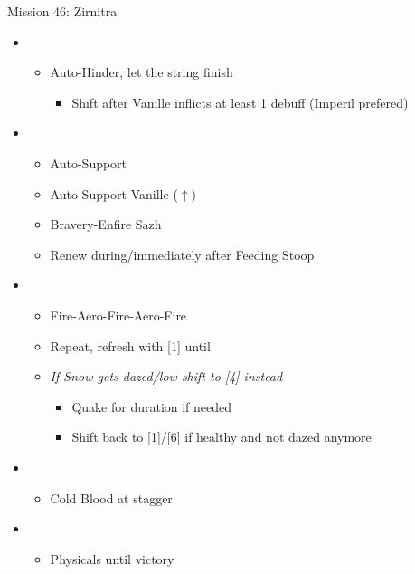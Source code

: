\begin{battle}{Mission 46: Zirnitra}
	\begin{itemize}
		\item \fifth
			\begin{itemize}
				\item Auto-Hinder, let the string finish
					\begin{itemize}
						\item Shift after Vanille inflicts at least 1 debuff (Imperil prefered)
					\end{itemize}
			\end{itemize}
		\item \third
			\begin{itemize}
				\item Auto-Support
				\item Auto-Support Vanille ($\uparrow$)
				\item Bravery-Enfire Sazh
				\item Renew during/immediately after Feeding Stoop
			\end{itemize}
		\item \sixth
			\begin{itemize}
				\item Fire-Aero-Fire-Aero-Fire
				\item Repeat, refresh with [1] until \stagger
				\item \textit{If Snow gets dazed/low shift to [4] instead}
					\begin{itemize}
						\item Quake for duration if needed
						\item Shift back to [1]/[6] if healthy and not dazed anymore
					\end{itemize}
			\end{itemize}
		\item \sixth
			\begin{itemize}
				\item Cold Blood at stagger
			\end{itemize}
		\item \second
			\begin{itemize}
				\item Physicals until victory
			\end{itemize}																			
	\end{itemize}
\end{battle}

